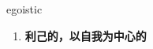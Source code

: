 
\begin{frame}
{\huge egoistic}
\begin{center}
\begin{enumerate}\Large
  \item \textbf{利己的，以自我为中心的}
\end{enumerate}
\end{center}
\end{frame}
